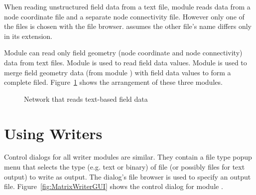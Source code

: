 When reading unstructured field data from a text file, module
 reads data from a node coordinate file and a
separate node connectivity file.  However only one of the files is
chosen with the file browser.   assumes the other
file's name differs only in its extension.

Module  can read only field geometry (node
coordinate and node connectivity) data from text files.  Module
 is used to read field data values.  Module
 is used to merge field geometry data (from
module ) with field data values to form a complete
filed.  Figure~\ref{fig:ReadFieldNet} shows the arrangement of these
three modules.

\begin{figure}[htb]
  \centering
  \begin{makeimage} \end{makeimage}
  \ReadFieldNet
  \caption{\label{fig:ReadFieldNet} Network that reads text-based field data}
\end{figure}

\section{Using Writers}
\label{sec:using_writers}

\newcommand{\MatrixWriterGUI}{%
  \includegraphics[0,0][358,227]{../Figures/MatrixReaderGUI.eps.gz}
}
\begin{htmlonly}
  \newcommand{\MatrixWriterGUI}{%
    \htmladdimg[alt="MatrixWriter dialog"]{../Figures/MatrixReaderGUI.gif}
  }
\end{htmlonly}

\newcommand{\WriteFieldNet}{%
  \includegraphics[0,0][387,224]{Figures/WriteFieldNet.eps.gz}
}
\begin{htmlonly}
  \newcommand{\WriteFieldNet}{%
    \htmladdimg[alt="Network that reads a text-based field"]{../Figures/WriteFieldNet.gif}
  }
\end{htmlonly}

Control dialogs for all writer modules are similar.  They contain a file
type popup menu that selects the type (e.g. text or binary) of file
(or possibly files for text output) to write as output.  The dialog's
file browser is used to specify an output file.  Figure~\ref{fig:MatrixWriterGUI}
shows the control dialog for module .  

